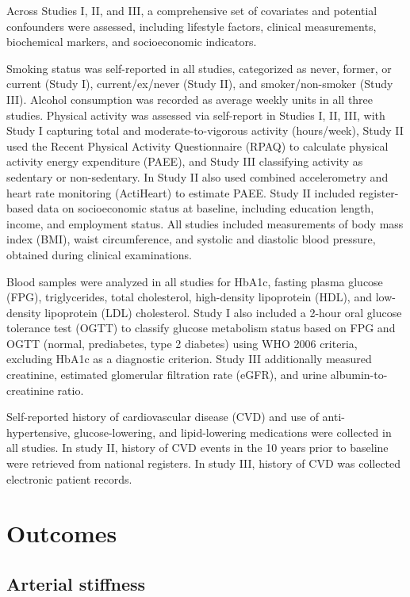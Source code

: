 \documentclass[
  a4paper,
  headsepline=true,
  open=any]{scrbook}
\begin{document}
Across Studies I, II, and III, a comprehensive set of covariates and
potential confounders were assessed, including lifestyle factors,
clinical measurements, biochemical markers, and socioeconomic
indicators.

Smoking status was self-reported in all studies, categorized as never,
former, or current (Study I), current/ex/never (Study II), and
smoker/non-smoker (Study III). Alcohol consumption was recorded as
average weekly units in all three studies. Physical activity was
assessed via self-report in Studies I, II, III, with Study I capturing
total and moderate-to-vigorous activity (hours/week), Study II used the
Recent Physical Activity Questionnaire (RPAQ) to calculate physical
activity energy expenditure (PAEE), and Study III classifying activity
as sedentary or non-sedentary. In Study II also used combined
accelerometry and heart rate monitoring (ActiHeart) to estimate PAEE.
Study II included register-based data on socioeconomic status at
baseline, including education length, income, and employment status. All
studies included measurements of body mass index (BMI), waist
circumference, and systolic and diastolic blood pressure, obtained
during clinical examinations.

Blood samples were analyzed in all studies for HbA1c, fasting plasma
glucose (FPG), triglycerides, total cholesterol, high-density
lipoprotein (HDL), and low-density lipoprotein (LDL) cholesterol. Study
I also included a 2-hour oral glucose tolerance test (OGTT) to classify
glucose metabolism status based on FPG and OGTT (normal, prediabetes,
type 2 diabetes) using WHO 2006 criteria, excluding HbA1c as a
diagnostic criterion. Study III additionally measured creatinine,
estimated glomerular filtration rate (eGFR), and urine
albumin-to-creatinine ratio.

Self-reported history of cardiovascular disease (CVD) and use of
anti-hypertensive, glucose-lowering, and lipid-lowering medications were
collected in all studies. In study II, history of CVD events in the 10
years prior to baseline were retrieved from national registers. In study
III, history of CVD was collected electronic patient records.

\hypertarget{outcomes}{%
\section{Outcomes}\label{outcomes}}

\hypertarget{arterial-stiffness}{%
\subsection{Arterial stiffness}\label{arterial-stiffness}}
\end{document}
